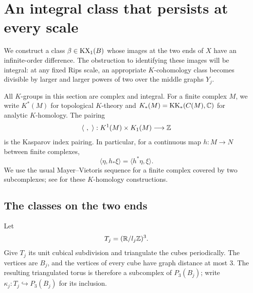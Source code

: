 \section{An integral class that persists at every scale}
\label{sec:persistence}

We construct a class $\beta\in\operatorname{KX}_1(B)$ whose images at the two ends of
$X$ have an infinite-order difference. The obstruction to identifying
these images will be integral: at any fixed Rips scale, an appropriate
$K$-cohomology class becomes divisible by larger and larger powers of two
over the middle graphs $Y_j$.

All $K$-groups in this section are complex and integral. For a finite
complex $M$, we write $K^*(M)$ for topological $K$-theory and
$K_*(M)=\operatorname{KK}_*(C(M),\mathbb C)$ for analytic $K$-homology. The pairing
\[
 \langle\ ,\ \rangle:K^1(M)\times K_1(M)\longrightarrow\Z
\]
is the Kasparov index pairing. In particular, for a continuous map
$h:M\to N$ between finite complexes,
\begin{equation}
 \langle\eta,h_*\xi\rangle=\langle h^*\eta,\xi\rangle.
 \label{top:pairing-naturality}
\end{equation}
We use the usual Mayer--Vietoris sequence for a finite complex covered
by two subcomplexes; see \cite{HigsonRoe00} for these $K$-homology
constructions.

\subsection{The classes on the two ends}

Let
\[
 T_j=(\mathbb R/l_j\mathbb Z)^3.
\]
Give $T_j$ its unit cubical subdivision and triangulate the cubes
periodically. The vertices are $B_j$, and the vertices of every cube
have graph distance at most $3$. The resulting triangulated torus is
therefore a subcomplex of $P_3(B_j)$; write
$\kappa_j:T_j\hookrightarrow P_3(B_j)$ for its inclusion.

